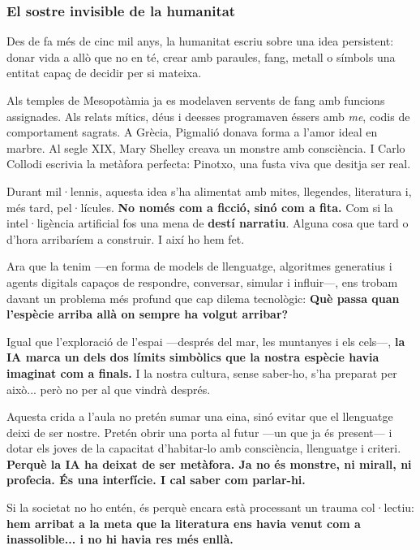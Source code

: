 \documentclass[12pt,a4paper]{article}
\begin{document}
	\bigskip
	
	\subsubsection*{El sostre invisible de la humanitat}
	
	Des de fa més de cinc mil anys, la humanitat escriu sobre una idea persistent: donar vida a allò que no en té, crear amb paraules, fang, metall o símbols una entitat capaç de decidir per si mateixa. 
	
	Als temples de Mesopotàmia ja es modelaven servents de fang amb funcions assignades. Als relats mítics, déus i deesses programaven éssers amb \textit{me}, codis de comportament sagrats. A Grècia, Pigmalió donava forma a l'amor ideal en marbre. Al segle XIX, Mary Shelley creava un monstre amb consciència. I Carlo Collodi escrivia la metàfora perfecta: Pinotxo, una fusta viva que desitja ser real.
	
	Durant mil·lennis, aquesta idea s’ha alimentat amb mites, llegendes, literatura i, més tard, pel·lícules. \textbf{No només com a ficció, sinó com a fita.} Com si la intel·ligència artificial fos una mena de \textbf{destí narratiu}. Alguna cosa que tard o d’hora arribaríem a construir. I així ho hem fet.
	
	Ara que la tenim —en forma de models de llenguatge, algoritmes generatius i agents digitals capaços de respondre, conversar, simular i influir—, ens trobam davant un problema més profund que cap dilema tecnològic:  
	\textbf{Què passa quan l'espècie arriba allà on sempre ha volgut arribar?}
	
	Igual que l’exploració de l’espai —després del mar, les muntanyes i els cels—, \textbf{la IA marca un dels dos límits simbòlics que la nostra espècie havia imaginat com a finals.} I la nostra cultura, sense saber-ho, s’ha preparat per això... però no per al que vindrà després.
	
	Aquesta crida a l’aula no pretén sumar una eina, sinó evitar que el llenguatge deixi de ser nostre. Pretén obrir una porta al futur —un que ja és present— i dotar els joves de la capacitat d’habitar-lo amb consciència, llenguatge i criteri. \textbf{Perquè la IA ha deixat de ser metàfora. Ja no és monstre, ni mirall, ni profecia. És una interfície. I cal saber com parlar-hi.}
	
	Si la societat no ho entén, és perquè encara està processant un trauma col·lectiu:  
	\textbf{hem arribat a la meta que la literatura ens havia venut com a inassolible... i no hi havia res més enllà.}
	
\end{document}
